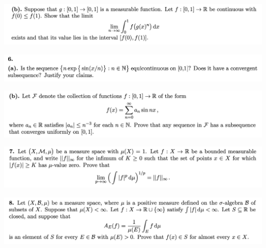 \begin{mdframed}
\includegraphics[width=400pt]{img/analysis--berkeley-202a-final-cd70.png}
\end{mdframed}

\newpage
\begin{mdframed}
\includegraphics[width=400pt]{img/analysis--berkeley-202a-final-f5b6.png}
\end{mdframed}

\begin{mdframed}
\includegraphics[width=400pt]{img/analysis--berkeley-202a-final-c7c7.png}
\end{mdframed}

\newpage
\begin{mdframed}
\includegraphics[width=400pt]{img/analysis--berkeley-202a-final-0000.png}
\end{mdframed}

\newpage
\begin{mdframed}
\includegraphics[width=400pt]{img/analysis--berkeley-202a-final-8aed.png}
\end{mdframed}

